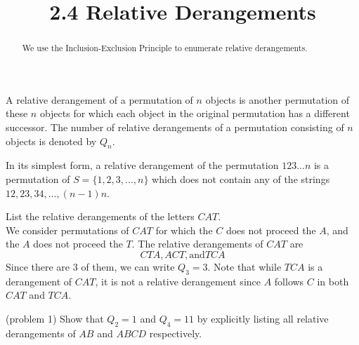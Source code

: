 \documentclass[handout]{ximera}
\title{2.4 Relative Derangements}
\begin{document}
\begin{abstract}
We use the Inclusion-Exclusion Principle to enumerate relative derangements.
\end{abstract}

\maketitle



\begin{definition}
A relative derangement of a permutation of $n$ objects is another permutation of these $n$ objects for which each object in the original 
permutation has a different successor. The number of relative derangements of a permutation consisting 
of $n$ objects is denoted by $Q_n$.
\end{definition}

\begin{remark}
In its simplest form, a relative derangement of the permutation $123...n$ is a permutation of $S = \{1, 2, 3, ..., n\}$ which does not contain any of the strings $12, 23, 34, ..., (n-1)n$.
\end{remark}

\begin{example}
List the relative derangements of the letters $CAT$.\\
  We consider permutations of $CAT$ for which the $C$ does not proceed 
the $A$, and the $A$ does not proceed the $T$. The relative derangements of $CAT$ are
\[
CTA, ACT, \text{and} TCA
\]
Since there are 3 of them, we can write $Q_3 = 3$.
Note that while $TCA$ is a derangement of $CAT$, it is not a relative derangement 
since $A$ follows $C$ in both $CAT$ and $TCA$.
\end{example}

\begin{problem}(problem 1)
Show that $Q_2 = 1$ and $Q_4 = 11$ by explicitly listing all relative derangements of $AB$ and $ABCD$ respectively.
\end{problem}
\end{document}
